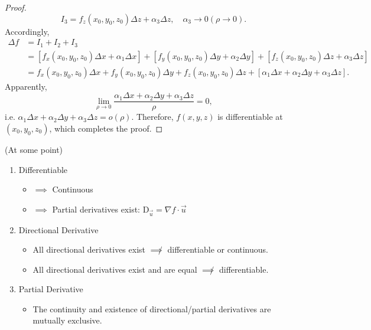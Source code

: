 \documentclass[11pt]{../../TexTemplate/elegantbook}
\begin{document}
\begin{proof}
    \[
        I_{3}=f_{z}(x_{0},y_{0},z_{0})\Delta z + \alpha_{3}\Delta z, \quad \alpha_{3}\to 0(\rho\to 0).
    \]
    Accordingly, 
    \begin{align*}
        \Delta f &= I_{1} + I_{2} + I_{3} \\
        &= \left[ f_{x}(x_{0},y_{0},z_{0})\Delta x + \alpha_{1}\Delta x \right] + \left[ f_{y}(x_{0},y_{0},z_{0})\Delta y + \alpha_{2}\Delta y \right] + \left[ f_{z}(x_{0},y_{0},z_{0})\Delta z + \alpha_{3}\Delta z \right] \\
        &= f_{x}(x_{0},y_{0},z_{0})\Delta x + f_{y}(x_{0},y_{0},z_{0})\Delta y + f_{z}(x_{0},y_{0},z_{0})\Delta z + \left[ \alpha_{1}\Delta x + \alpha_{2}\Delta y + \alpha_{3}\Delta z \right].
    \end{align*}
    Apparently, 
    \[
        \lim_{\rho \to 0} \frac{\alpha_{1}\Delta x + \alpha_{2}\Delta y + \alpha_{3}\Delta z}{\rho} = 0,
    \]
    i.e. \(\alpha_{1}\Delta x + \alpha_{2}\Delta y + \alpha_{3}\Delta z = o(\rho)\). 
    Therefore, \(f(x,y,z)\) is differentiable at \((x_{0},y_{0},z_{0})\), which completes the proof.
\end{proof}

\begin{note}{(At some point)}
    \begin{enumerate}
        \item  Differentiable
            \begin{itemize}
                \item \(\implies\) Continuous
                \item \(\implies\) Partial derivatives exist: \(\mathrm{D}_{\vec{u}}=\nabla f\cdot\vec{u}\)
            \end{itemize}
        \item  Directional Derivative
            \begin{itemize}
                \item All directional derivatives exist \(\not\implies\) differentiable or continuous.
                \item All directional derivatives exist and are equal \(\not\implies\) differentiable.
            \end{itemize}
        \item  Partial Derivative
        \begin{itemize}
            \item  The continuity and existence of directional/partial derivatives are mutually exclusive.
        \end{itemize}
    \end{enumerate}
\end{note}
\end{document}
